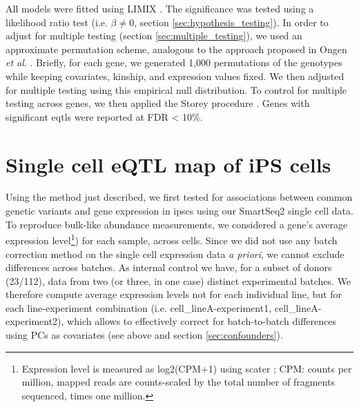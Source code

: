 \vspace{1.5mm}

\newpage

All models were fitted using LIMIX \cite{lippert2014limix, casale2015efficient}. 
The significance was tested using a likelihood ratio test (i.e. $\beta \neq 0$, section 
\ref{sec:hypothesis_testing}).
In order to adjust for multiple testing (section
\ref{sec:multiple_testing}),
we used an approximate permutation scheme, analogous to the approach proposed in Ongen \textit{et al}. \cite{ongen2016fast}. 
Briefly, for each gene, we generated 1,000 permutations of the genotypes while keeping covariates, kinship, and expression values fixed. 
We then adjusted for multiple testing using this empirical null distribution.
To control for multiple testing across genes, we then applied the Storey procedure \cite{storey2003statistical}. 
Genes with significant \glspl{eqtl} were reported at FDR < 10\%.


\section{Single cell eQTL map of iPS cells}

Using the method just described, we first tested for associations between common genetic variants and gene expression in \glspl{ipsc} using our SmartSeq2 single cell data.\\

To reproduce bulk-like abundance measurements, we considered a gene's average expression level\footnote{Expression level is measured as log2(CPM+1) using scater \cite{mccarthy2017scater}; CPM: counts per million, mapped reads are counts-scaled by the total number of fragments sequenced, times one million.}) for each sample, across cells.
Since we did not use any batch correction method on the single cell expression data \textit{a priori}, we cannot exclude differences across batches.
As internal control we have, for a subset of donors (23/112), data from two (or three, in one case) distinct experimental batches.
We therefore compute average expression levels not for each individual line, but for each line-experiment combination (i.e. cell\_lineA-experiment1, cell\_lineA-experiment2), which allows to effectively correct for batch-to-batch differences using PCs as covariates (see above and section
\ref{sec:confounders}).
\\

